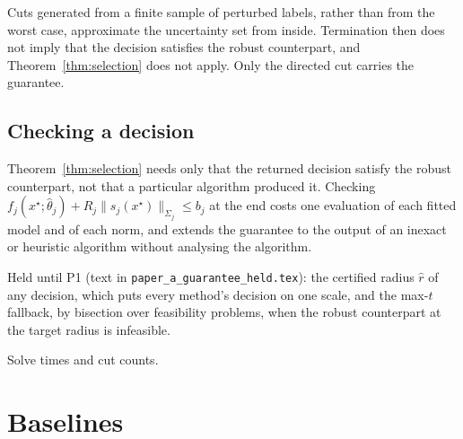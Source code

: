 Cuts generated from a finite sample of perturbed labels, rather than from the
worst case, approximate the uncertainty set from inside. Termination then
does not imply that the decision satisfies the robust counterpart, and
Theorem~\ref{thm:selection} does not apply. Only the directed cut carries the
guarantee.

\subsection{Checking a decision}
Theorem~\ref{thm:selection} needs only that the returned decision satisfy the
robust counterpart, not that a particular algorithm produced it. Checking
$f_j(x^\star;\hat\theta_j) + R_j\|s_j(x^\star)\|_{\Sigma_j} \le b_j$ at the
end costs one evaluation of each fitted model and of each norm, and extends
the guarantee to the output of an inexact or heuristic algorithm without
analysing the algorithm.

\begin{outline}
Held until P1 (text in \texttt{paper\_a\_guarantee\_held.tex}): the
certified radius $\hat r$ of any decision, which puts every method's decision
on one scale, and the max-$t$ fallback, by bisection over feasibility
problems, when the robust counterpart at the target radius is infeasible.
\end{outline}

\begin{outline}
Solve times and cut counts. 
\end{outline}

\section{Baselines}\label{sec:baselines}

